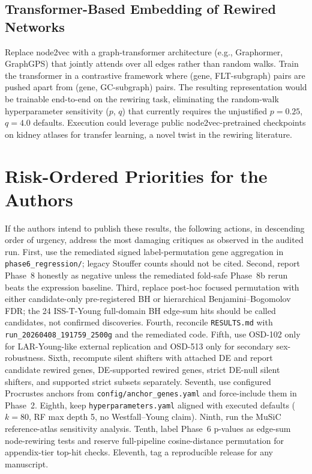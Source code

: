 \documentclass[11pt]{article}
\newcommand{\code}[1]{\texttt{#1}}
\begin{document}
\subsection{Transformer-Based Embedding of Rewired Networks}
Replace node2vec with a graph-transformer architecture (e.g., Graphormer, GraphGPS) that jointly attends over all edges rather than random walks. Train the transformer in a contrastive framework where (gene, FLT-subgraph) pairs are pushed apart from (gene, GC-subgraph) pairs. The resulting representation would be trainable end-to-end on the rewiring task, eliminating the random-walk hyperparameter sensitivity ($p$, $q$) that currently requires the unjustified $p{=}0.25$, $q{=}4.0$ defaults. Execution could leverage public node2vec-pretrained checkpoints on kidney atlases for transfer learning, a novel twist in the rewiring literature.

\section{Risk-Ordered Priorities for the Authors}

If the authors intend to publish these results, the following actions, in descending order of urgency, address the most damaging critiques as observed in the audited run. First, use the remediated signed label-permutation gene aggregation in \code{phase6\_regression/}; legacy Stouffer counts should not be cited. Second, report Phase~8 honestly as negative unless the remediated fold-safe Phase~8b rerun beats the expression baseline. Third, replace post-hoc focused permutation with either candidate-only pre-registered BH or hierarchical Benjamini--Bogomolov FDR; the 24 ISS-T-Young full-domain BH edge-sum hits should be called candidates, not confirmed discoveries. Fourth, reconcile \code{RESULTS.md} with \code{run\_20260408\_191759\_2500g} and the remediated code. Fifth, use OSD-102 only for LAR-Young-like external replication and OSD-513 only for secondary sex-robustness. Sixth, recompute silent shifters with attached DE and report candidate rewired genes, DE-supported rewired genes, strict DE-null silent shifters, and supported strict subsets separately. Seventh, use configured Procrustes anchors from \code{config/anchor\_genes.yaml} and force-include them in Phase~2. Eighth, keep \code{hyperparameters.yaml} aligned with executed defaults ($k{=}80$, RF max depth 5, no Westfall--Young claim). Ninth, run the MuSiC reference-atlas sensitivity analysis. Tenth, label Phase~6 p-values as edge-sum node-rewiring tests and reserve full-pipeline cosine-distance permutation for appendix-tier top-hit checks. Eleventh, tag a reproducible release for any manuscript.
\end{document}
